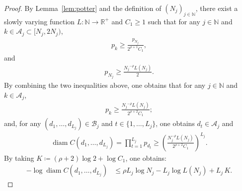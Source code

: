 \documentclass[12pt,reqno]{amsart}
\theoremstyle{definition}
\theoremstyle{plain}
\begin{document}
\begin{proof}
By Lemma~\ref{lem:potter} and the definition of $(N_j)_{j\in\mathbb{N}}$, there exist a slowly varying function $L:\mathbb{N}\to\mathbb{R}^+$ and $C_1\geq 1$ such that for any $j\in\mathbb{N}$ and $k\in \mathcal{A}_j\subset [N_j,2N_j)$,
\begin{align*}
    p_k\geq \frac{p_{N_j}}{2^{\rho+1}C_1},
\end{align*}
and
\begin{align*}
    p_{N_j}
    \geq \frac{{N_j}^{-\rho}L(N_j)}{2}.
\end{align*}
By combining the two inequalities above, one obtains that for any $j\in\mathbb{N}$ and $k\in \mathcal{A}_j$,
\begin{align*}
    p_k\geq \frac{{N_j}^{-\rho}L(N_j)}{2^{\rho+2}C_1};
\end{align*}
and, for any $(d_1,\ldots,d_{L_j})\in\mathcal{B}_j$ and $t\in\{1,\ldots,L_j\}$, one obtains $d_t\in \mathcal{A}_j$ and 
\begin{align*}
    \operatorname{diam} C(d_1,\ldots,d_{L_j})
    =\prod_{t=1}^{L_j}p_{d_t}
    \geq 
    \left(\frac{N_j^{-\rho}L(N_j)}{2^{\rho+2}C_1}\right)^{L_j}.
\end{align*}
By taking $K\coloneqq(\rho+2)\log2+\log{C_1}$, one obtains:
\begin{align}
\label{eq:-logdiam_upper}
    -\log \operatorname{diam} C(d_1,\ldots,d_{L_j})
    &\leq
    \rho L_j\log N_j - L_j\log L(N_j) + L_j\,K.
\end{align}


\end{proof}
\end{document}
